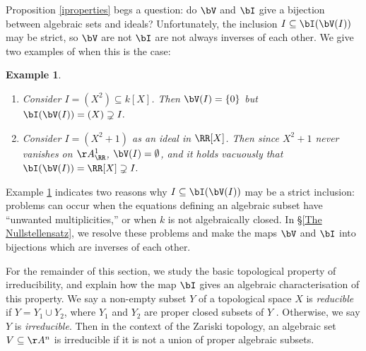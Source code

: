 \documentclass[12pt]{amsart}
\theoremstyle{plain}
\newtheorem{example}[theorem]{Example}
\begin{document}
Proposition \ref{iproperties} begs a question: do $\bV$ and $\bI$ give a bijection between algebraic sets and ideals?
Unfortunately, the inclusion $I \subseteq \bI(\bV(I))$ may be strict, so $\bV$ are not $\bI$ are not always inverses of each other.
We give two examples of when this is the case:

\begin{example}\label{inclfails}
\begin{enumerate}
\item
Consider $I = (X^2) \subseteq k[X]$.
Then $\bV(I) = \{0\}$ but $\bI(\bV(I)) = (X) \supsetneq I.$

\item
Consider $I = (X^2+1)$ as an ideal in $\RR[X]$.
Then since $X^2+1$ never vanishes on $\AA^1_\RR$, $\bV(I) = \emptyset$, and it holds vacuously that $\bI(\bV(I)) = \RR[X] \supsetneq I.$
\end{enumerate}
\end{example}

Example \ref{inclfails} indicates two reasons why $I \subseteq \bI(\bV(I))$ may be a strict inclusion:
problems can occur when the equations defining an algebraic subset have ``unwanted multiplicities,'' or when $k$ is not algebraically closed.
In \S \ref{The Nullstellensatz}, we resolve these problems and make the maps $\bV$ and $\bI$ into bijections which are inverses of each other.

For the remainder of this section, we study the basic topological property of irreducibility, and explain how the map $\bI$ gives an algebraic characterisation of this property.
We say a non-empty subset $Y$ of a topological space $X$ is \emph{reducible} if $Y = Y_1 \cup Y_2$, where $Y_1$ and $Y_2$ are proper closed subsets of $Y$ \cite[Chapter I]{Hartshorne77}.
Otherwise, we say $Y$ is \emph{irreducible}.
Then in the context of the Zariski topology, an algebraic set $V \subseteq \AA^n$ is irreducible if it is not a union of proper algebraic subsets.
\end{document}
